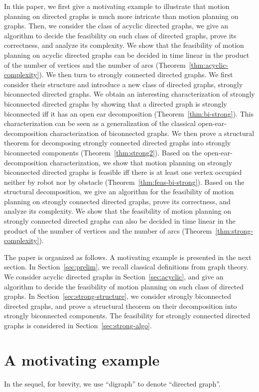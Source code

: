 \documentclass{article}
\begin{document}
In this paper, we first give a motivating example to illustrate that
motion planning on directed graphs is much more intricate than
motion planning on graphs. Then, we consider the class of acyclic
directed graphs, we give an algorithm to decide the feasibility on
such class of directed graphs, prove its correctness, and analyze
its complexity. We show that the feasibility of motion planning on
acyclic directed graphs can be decided in time linear in the product
of the number of vertices and the number of arcs
(Theorem~\ref{thm:acyclic-complexity}). We then turn to strongly
connected directed graphs. We first consider their structure and
introduce a new class of directed graphs, strongly biconnected
directed graphs. We obtain an interesting characterization of
strongly biconnected directed graphs by showing that a directed
graph is strongly biconnected iff it has an open ear decomposition
(Theorem~\ref{thm:bi-strong}). This characterization can be seen as
a generalization of the classical open-ear-decomposition
characterization of biconnected graphs. We then prove a structural
theorem for decomposing strongly connected directed graphs into
strongly biconnected components (Theorem~\ref{thm:strong2}). Based
on the open-ear-decomposition characterization, we show that motion
planning on strongly biconnected directed graphs is feasible iff
there is at least one vertex occupied neither by robot nor by
obstacle (Theorem~\ref{thm:feas-bi-strong}). Based on the structural
decomposition, we give an algorithm for the feasibility of motion
planning on strongly connected directed graphs, prove its
correctness, and analyze its complexity. We show that the
feasibility of motion planning on strongly connected directed graphs
can also be decided in time linear in the product of the number of
vertices and the number of arcs
(Theorem~\ref{thm:strong-complexity}).

The paper is organized as follows. A motivating example is presented
in the next section. In Section~\ref{sec:prelim}, we recall
classical definitions from graph theory. We consider acyclic
directed graphs in Section~\ref{sec:acyclic}, and give an algorithm
to decide the feasibility of motion planning on such class of
directed graphs. In Section~\ref{sec:strong-structure}, we consider
strongly biconnected directed graphs, and prove a structural theorem
on their decomposition into strongly biconnected components. The
feasibility for strongly connected directed graphs is considered in
Section~\ref{sec:strong-algo}.

\section{A motivating example}
In the sequel, for brevity, we use ``digraph'' to denote ``directed
graph''.
\end{document}
